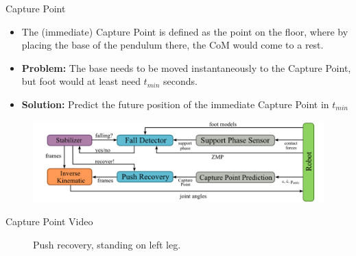 \begin{frame}{Capture Point}

\begin{itemize}
\item
  The (immediate) Capture Point is defined as the point on the floor,
  where by placing the base of the pendulum there, the CoM would come to
  a rest. \cite{koolen2012capturability}
\item
  \textbf{Problem:} The base needs to be moved instantaneously to the
  Capture Point, but foot would at least need \(t_{min}\) seconds.
\item
  \textbf{Solution:} Predict the future position of the immediate
  Capture Point in \(t_{min}\)
\end{itemize}

\begin{figure}
  \begin{center}
     \includegraphics[width=\textwidth]{images/recovery_architechture.png}
  \end{center}
\end{figure}

\end{frame}

\begin{frame}{Capture Point Video}

\begin{figure}
  \begin{center}
  \end{center}
  \caption{Push recovery, standing on left leg.}
\end{figure}

\end{frame}

